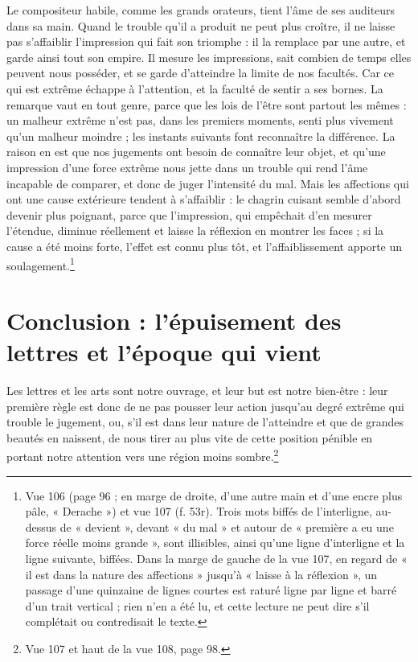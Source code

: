\documentclass[11pt,a4paper]{article}
\begin{document}
Le compositeur habile, comme les grands orateurs, tient l'âme de ses auditeurs
dans sa main. Quand le trouble qu'il a produit ne peut plus croître, il ne laisse
pas s'affaiblir l'impression qui fait son triomphe : il la remplace par une autre,
et garde ainsi tout son empire. Il mesure les impressions, sait combien de temps
elles peuvent nous posséder, et se garde d'atteindre la limite de nos facultés.
Car ce qui est extrême échappe à l'attention, et la faculté de sentir a ses bornes.
La remarque vaut en tout genre, parce que les lois de l'être sont partout les
mêmes : un malheur extrême n'est pas, dans les premiers moments, senti plus
vivement qu'un malheur moindre ; les instants suivants font reconnaître la
différence. La raison en est que nos jugements ont besoin de connaître leur
objet, et qu'une impression d'une force extrême nous jette dans un trouble qui
rend l'âme incapable de comparer, et donc de juger l'intensité du mal. Mais les
affections qui ont une cause extérieure tendent à s'affaiblir : le chagrin
cuisant semble d'abord devenir plus poignant, parce que l'impression, qui empêchait
d'en mesurer l'étendue, diminue réellement et laisse la réflexion en montrer les
faces ; si la cause a été moins forte, l'effet est connu plus tôt, et
l'affaiblissement apporte un soulagement.\footnote{Vue 106 (page 96 ; en marge de
droite, d'une autre main et d'une encre plus pâle, « Derache ») et vue 107
(f. 53r). Trois mots biffés de l'interligne, au-dessus de « devient », devant
« du mal » et autour de « première a eu une force réelle moins grande », sont
illisibles, ainsi qu'une ligne d'interligne et la ligne suivante, biffées. Dans
la marge de gauche de la vue 107, en regard de « il est dans la nature des
affections » jusqu'à « laisse à la réflexion », un passage d'une quinzaine de
lignes courtes est raturé ligne par ligne et barré d'un trait vertical ; rien
n'en a été lu, et cette lecture ne peut dire s'il complétait ou contredisait le
texte.}

\section*{Conclusion : l'épuisement des lettres et l'époque qui vient}

Les lettres et les arts sont notre ouvrage, et leur but est notre bien-être : leur
première règle est donc de ne pas pousser leur action jusqu'au degré extrême qui
trouble le jugement, ou, s'il est dans leur nature de l'atteindre et que de
grandes beautés en naissent, de nous tirer au plus vite de cette position pénible
en portant notre attention vers une région moins sombre.\footnote{Vue 107 et haut
de la vue 108, page 98.}
\end{document}
